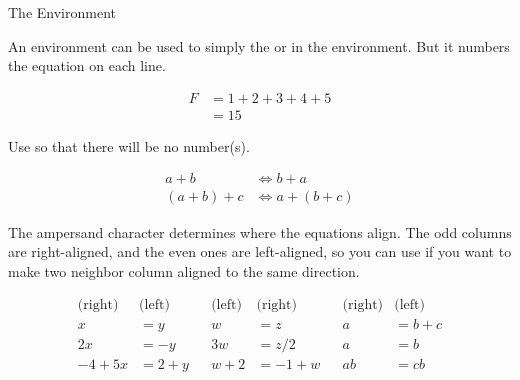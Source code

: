 \begin{frame}[fragile]{The  Environment}

An  environment can be used to simply the  or  in the   environment. But it numbers the equation on each line.

\begin{latexexamplesplit}
\begin{align}
  F &= 1+2+3+4+5 \\
    &= 15
\end{align}
\end{latexexamplesplit}

Use  so that there will be no number(s).

\begin{latexexamplesplit}[0.6]
\begin{align*}
  a+b & \Leftrightarrow b+a \\
  (a+b)+c & \Leftrightarrow a+(b+c)
\end{align*}
\end{latexexamplesplit}

\end{frame}

\begin{frame}[fragile]

The ampersand character \LC{&} determines where the equations align. The odd columns are right-aligned, and the even ones are left-aligned, so you can use \LC{&&} if you want to make two neighbor column aligned to the same direction.

\setlength{\belowdisplayskip}{-10pt}
\begin{latexexample}
\begin{align*}
  \text{(right)} & \text{(left)} && \text{(left)} & \text{(right)} 
  &&  \text{(right)} & \text{(left)} \\
  x     &=y     &&  w   &=z        &&  a&=b+c \\
  2x    &=-y    &&  3w  &=z/2      &&  a&=b \\
  -4+5x &=2+y   &&  w+2 &=-1+w     &&  ab&=cb
\end{align*}
\end{latexexample}

\end{frame}


